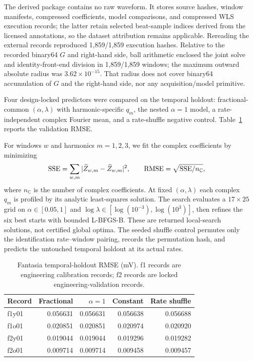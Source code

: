 \documentclass[11pt]{article}
\theoremstyle{definition}
\theoremstyle{remark}
\newcommand{\C}{\mathbb C}
\begin{document}
The derived package contains no raw waveform.  It stores source hashes,
window manifests, compressed coefficients, model comparisons, and compressed
WLS execution records; the latter retain selected beat-sample indices derived
from the licensed annotations, so the dataset attribution remains applicable.
Rereading the external records reproduced 1,859/1,859
execution hashes.  Relative to the recorded binary64 $G$ and right-hand side,
ball arithmetic enclosed the joint solve and identity-front-end division in
1,859/1,859 windows; the maximum outward absolute radius was
$3.62\times10^{-15}$.  That radius does not cover binary64 accumulation of
$G$ and the right-hand side, nor any acquisition/model primitive.

Four design-locked predictors were compared on the temporal holdout:
fractional-common $(\alpha,\lambda)$ with harmonic-specific $q_m$, the nested
$\alpha=1$ model, a rate-independent complex Fourier mean, and a rate-shuffle
negative control.  Table~\ref{tab:fantasia-main} reports the validation RMSE.

For windows $w$ and harmonics $m=1,2,3$, we fit the complex coefficients by
minimizing
\[
 {\rm SSE}=\sum_{w,m}|\widetilde Z_{w,m}-\widehat Z_{w,m}|^2,
 \qquad {\rm RMSE}=\sqrt{{\rm SSE}/n_{\C}},
\]
where $n_{\C}$ is the number of complex coefficients.  At fixed
$(\alpha,\lambda)$ each complex $q_m$ is profiled by its analytic least-squares
solution.  The search evaluates a $17\times25$ grid on
$\alpha\in[0.05,1]$ and
$\log\lambda\in[\log(10^{-3}),\log(10^3)]$, then refines
the six best starts with bounded L-BFGS-B.  These are returned local-search
solutions, not certified global optima.  The seeded shuffle control permutes
only the identification rate--window pairing, records the permutation hash,
and predicts the untouched temporal holdout at its actual rates.

\begin{table}[t]
\centering
\caption{Fantasia temporal-holdout RMSE (mV).  f1 records are engineering
calibration records; f2 records are locked engineering-validation records.}
\label{tab:fantasia-main}
\small
\begin{tabular}{@{}lrrrr@{}}
\toprule
Record & Fractional & $\alpha=1$ & Constant & Rate shuffle \\
\midrule
f1y01 & 0.056631 & 0.056631 & 0.056638 & 0.056688 \\
f1o01 & 0.020851 & 0.020851 & 0.020974 & 0.020920 \\
f2y01 & 0.019044 & 0.019044 & 0.019296 & 0.019282 \\
f2o01 & 0.009714 & 0.009714 & 0.009458 & 0.009457 \\
\bottomrule
\end{tabular}
\end{table}
\end{document}
